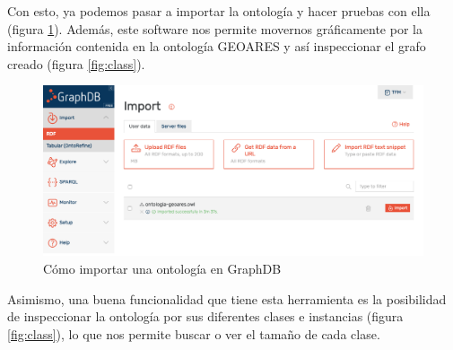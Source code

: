 %
%
%
%

Con esto, ya podemos pasar a importar la ontología y hacer pruebas con ella (figura \ref{fig:import-owl}). Además, este software nos permite movernos gráficamente por la información contenida en la ontología GEOARES y así inspeccionar el grafo creado (figura \ref{fig:class}).

\begin{figure}[H]
	\centering
	\includegraphics[width=1\linewidth]{imagenes/capitulo5/import-owl}
	\caption{Cómo importar una ontología en GraphDB}
	\label{fig:import-owl}
\end{figure}


Asimismo, una buena funcionalidad que tiene esta herramienta es la posibilidad de inspeccionar la ontología por sus diferentes clases e instancias (figura \ref{fig:class}), lo que nos permite buscar o ver el tamaño de cada clase.

